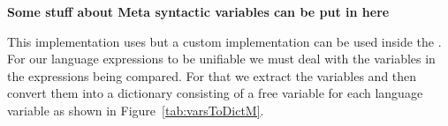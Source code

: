 \documentclass[thesis-solanki.tex]{subfiles}
\begin{document}

\textbf{Some stuff about Meta syntactic variables can be put in here}

This implementation uses 
but a custom implementation can be used inside the .
For our language expressions to be unifiable we must deal with the variables in the expressions being compared.
For that we extract the variables and then convert them into a dictionary consisting of a free variable for each
language variable as shown in Figure~\ref{tab:varsToDictM}.
\end{document}
